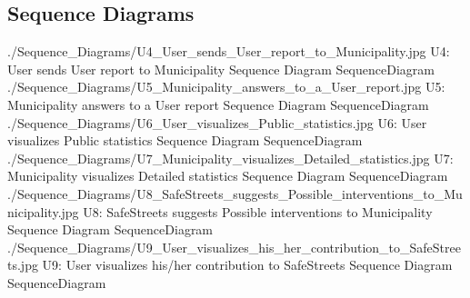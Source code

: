 \documentclass[../../../RASD.tex]{subfiles}
\begin{document}
\subsection{Sequence Diagrams\label{sect:3.2.4}}

\image {10cm} {./Sequence_Diagrams/U4_User_sends_User_report_to_Municipality.jpg} {U4: User sends User report to Municipality Sequence Diagram} {SequenceDiagram}
\image {8cm} {./Sequence_Diagrams/U5_Municipality_answers_to_a_User_report.jpg} {U5: Municipality answers to a User report Sequence Diagram} {SequenceDiagram}
\image {7cm} {./Sequence_Diagrams/U6_User_visualizes_Public_statistics.jpg} {U6: User visualizes Public statistics Sequence Diagram} {SequenceDiagram}
\image {8cm} {./Sequence_Diagrams/U7_Municipality_visualizes_Detailed_statistics.jpg} {U7: Municipality visualizes Detailed statistics Sequence Diagram} {SequenceDiagram}
\image {5cm} {./Sequence_Diagrams/U8_SafeStreets_suggests_Possible_interventions_to_Municipality.jpg} {U8: SafeStreets suggests Possible interventions to Municipality Sequence Diagram} {SequenceDiagram}
\image {6cm} {./Sequence_Diagrams/U9_User_visualizes_his_her_contribution_to_SafeStreets.jpg} {U9: User visualizes his/her contribution to SafeStreets Sequence Diagram} {SequenceDiagram} 
\end{document}
